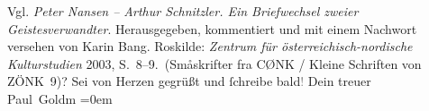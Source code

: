 \begin{ledgroupsized}[t]{13cm}
{{{                     Vgl. \emph{Peter Nansen – Arthur Schnitzler. Ein Briefwechsel
                        zweier Geistesverwandter}. Herausgegeben, kommentiert und mit einem
                     Nachwort versehen von Karin Bang. Roskilde:
                        \emph{Zentrum für österreichisch-nordische Kulturstudien}{ }2003, S. 8–9. (Småskrifter fra CØNK / Kleine Schriften
                     von ZÖNK 9)}}}\label{K_L02806-43h}?\pend
           \pstart
           Sei von Herzen gegrüßt und ſchreibe bald\textcolor{gray}{!}\pend
           \pstart
           Dein treuer {\\[\baselineskip]}\spacefill\mbox{Paul Goldm}\pend
           \leftskip=0em{}
         
         \endnumbering{}\end{ledgroupsized}  \newcommand{\dateiname}{L02806}\newcommand{\titel}{Paul Goldmann an Arthur Schnitzler, 22. 3. [1897]}\newcommand{\editorInnen}{Martin Anton Müller und Laura Untner}
      